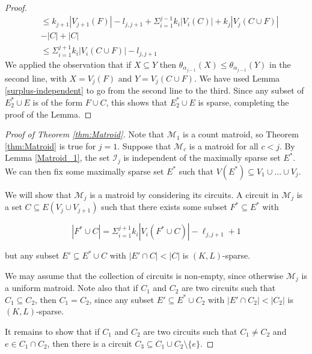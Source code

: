 \documentclass{article}
\begin{document}
\begin{proof}
\begin{align*}
&\leq   k_{j+1} |V_{j+1}(F)| -l_{j,{j+1}} + \Sigma_{i=1}^{j-1} k_i|V_i(C)| + k_{j}|V_{j}(C\cup F)|\\
&- |C| + |C|\\
&\leq  \Sigma_{i=1}^{j+1} k_{i}|V_{i}(C\cup F)|-l_{j,{j+1}} 
\end{align*}
We applied the observation that if $X\subseteq Y$ then $\theta_{\alpha_{j-1}}(X) \leq \theta_{\alpha_{j-1}}(Y)$ in the second line, with $X=V_{j}(F)$ and $Y = V_{j}(C\cup F)$. We have used Lemma \ref{surplus-independent} to go from the second line to the third. Since any subset of $E_2^{*} \cup E$ is of the form $F\cup C$, this shows that $E_2^{*} \cup E$ is sparse, completing the proof of the Lemma.
\end{proof}

\begin{proof}[Proof of Theorem \ref{thm:Matroid}]

Note that $\mathcal{M}_1$ is a count matroid, so Theorem \ref{thm:Matroid} is true for $j=1$. Suppose that $\mathcal{M}_c$ is a matroid for all $c < j$. By Lemma \ref{Matroid_1}, the set $\mathcal{I}_{j}$ is independent of the maximally sparse set $E^*$. We can then fix some maximally sparse set $E^*$ such that $V(E^*) \subseteq V_1 \cup \dots \cup V_{j}$.

We will show that $\mathcal{M}_j$ is a matroid by considering its circuits. A circuit in $\mathcal{M}_j$ is a set $C \subseteq E(V_j\cup V_{j+1})$ such that there exists some subset $F^{*} \subseteq E^{*}$ with 

\[
|F^{*} \cup C| = \Sigma_{i=1}^{j+1} k_i|V_i(F^{*} \cup C)|-\ell_{j,j+1}+1
\]

but any subset $E' \subseteq E^{*} \cup C$ with $|E' \cap C| < |C|$ is $(K,L)$-sparse. 

We may assume that the collection of circuits is non-empty, since otherwise $\mathcal{M}_j$ is a uniform matroid. Note also that if $C_1$ and $C_2$ are two circuits such that $C_1 \subseteq C_2$, then $C_1 = C_2$, since any subset $E' \subseteq E^{*} \cup C_2$ with $|E' \cap C_2| < |C_2|$ is $(K,L)$-sparse. 

It remains to show that if $C_1$ and $C_2$ are two circuits such that $C_1 \neq C_2$ and $e \in C_1 \cap C_2$, then there is a circuit $C_3 \subseteq C_1 \cup C_2 \setminus \{e\}$. 


\end{proof}
\end{document}
